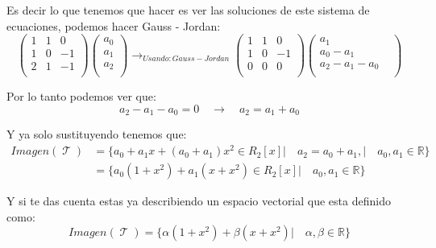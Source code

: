 \documentclass[12pt]{report}                                    %
\DeclareMathOperator \LinealTransformation {\mathcal{T}}
\begin{document}
            Es decir lo que tenemos que hacer es ver las soluciones de
            este sistema de ecuaciones, podemos hacer Gauss - Jordan:
            \begin{equation*}
                \begin{pmatrix} 1&1&0 \\ 1&0&-1 \\ 2&1&-1 \\\end{pmatrix} 
                \begin{pmatrix} a_0 \\ a_1 \\ a_2 \\\end{pmatrix}
                \to_{Usando: Gauss-Jordan}
                \begin{pmatrix} 1&1&0 \\ 1&0&-1 \\ 0&0&0 \\\end{pmatrix}
                \begin{pmatrix} a_1 & \\ a_0-a_1 &\\ a_2-a_1-a_0 &\\\end{pmatrix}
            \end{equation*}

            Por lo tanto podemos ver que:
            \begin{equation*}
                a_2-a_1-a_0 = 0
                \quad \to \quad
                a_2 = a_1 + a_0
            \end{equation*}

            Y ya solo sustituyendo tenemos que:
            \begin{equation*}
            \begin{split}
                Imagen(\LinealTransformation) 
                & = \{a_0+a_1x+(a_0+a_1)x^2 \in R_2[x] |\quad a_2 = a_0 + a_1, |\quad a_0, a_1 \in \mathbb{R}\}  \\
                & = \{a_0(1+x^2) +a_1(x+x^2) \in R_2[x] |\quad a_0, a_1 \in \mathbb{R}\}
            \end{split}
            \end{equation*}

            Y si te das cuenta estas ya describiendo un espacio vectorial que esta definido como:
            \begin{equation*}
                Imagen(\LinealTransformation) = \{\alpha(1+x^2) + \beta(x+x^2) |\quad \alpha, \beta \in \mathbb{R}\}
            \end{equation*}
\end{document}
